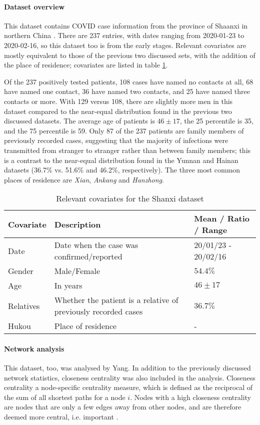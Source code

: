 \paragraph{Dataset overview} This dataset contains COVID case information from the province of Shaanxi in northern China \cite{shaanxi_data}. There are 237 entries, with dates ranging from 2020-01-23 to 2020-02-16, so this dataset too is from the early stages. Relevant covariates are mostly equivalent to those of the previous two discussed sets, with the addition of the place of residence; covariates are listed in table \ref{tab:shanxi_covariates}. 

Of the 237 positively tested patients, 108 cases have named no contacts at all, 68 have named one contact, 36 have named two contacts, and 25 have named three contacts or more.  With 129 versus 108, there are slightly more men in this dataset compared to the near-equal distribution found in the previous two discussed datasets. The average age of patients is $46\pm17$, the 25 percentile is 35, and the 75 percentile is 59. Only 87 of the 237 patients are family members of previously recorded cases, suggesting that the majority of infections were transmitted from stranger to stranger rather than between family members; this is a contrast to the near-equal distribution found in the Yunnan and Hainan datasets (36.7\% vs. 51.6\% and 46.2\%, respectively). The three most common places of residence are \emph{Xian}, \emph{Ankang} and \emph{Hanzhong}.

\begin{table}
	\begin{tabularx}{\linewidth}{XXX}
		\hline
		\textbf{Covariate} & \textbf{Description} & \textbf{Mean / Ratio / Range}\\
		\hline
		Date & Date when the case was confirmed/reported & 20/01/23 - 20/02/16\\
		Gender & Male/Female & $54.4\%$ \\
		Age & In years & $46\pm17$ \\
		Relatives & Whether the patient is a relative of previously recorded cases & $36.7\%$\\
		Hukou & Place of residence & -\\
		\hline
	\end{tabularx}
	\caption{Relevant covariates for the Shanxi dataset}
	\label{tab:shanxi_covariates}
\end{table}

\paragraph{Network analysis} This dataset, too, was analysed by Yang. In addition to the previously discussed network statistics, closeness centrality was also included in the analysis. Closeness centrality a node-specific centrality measure, which is defined as the reciprocal of the sum of all shortest paths for a node $i$. Nodes with a high closeness centrality are nodes that are only a few edges away from other nodes, and are therefore deemed more central, i.e. important \cite{sabidussi1966centrality}. 

